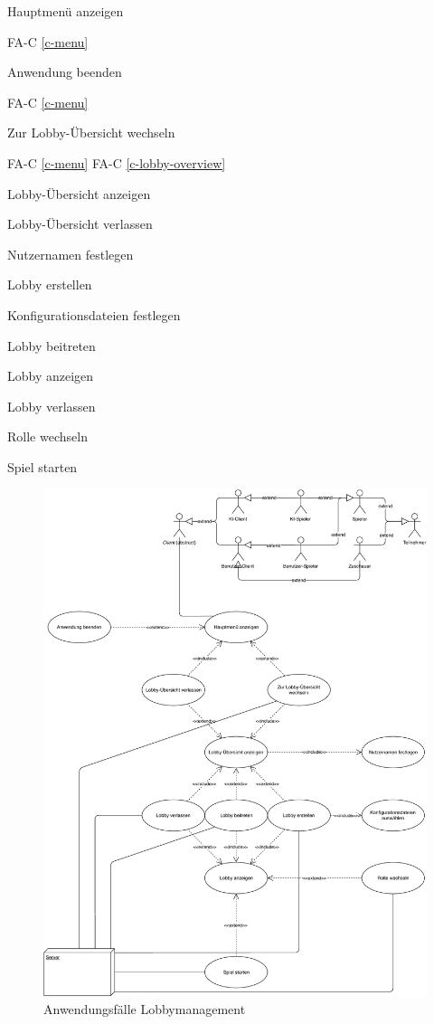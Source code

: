 Hauptmenü anzeigen

FA-C \ref{c-menu} %

Anwendung beenden

FA-C \ref{c-menu} %

Zur Lobby-Übersicht wechseln

FA-C \ref{c-menu} %
FA-C \ref{c-lobby-overview} %

Lobby-Übersicht anzeigen

Lobby-Übersicht verlassen

Nutzernamen festlegen

Lobby erstellen

Konfigurationsdateien festlegen

Lobby beitreten

Lobby anzeigen

Lobby verlassen

Rolle wechseln

Spiel starten



\begin{figure}
  \centering
  \includegraphics[width=\textwidth]{Meilenstein02/use_case_lobbymanagement.pdf}
  \caption{Anwendungsfälle Lobbymanagement}
\end{figure}